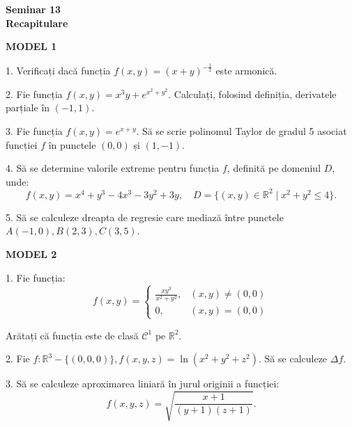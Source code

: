 \documentclass[11pt,a4paper]{article}
\newcommand\kal{\mathcal}
\newcommand\RR{\mathbb{R}}
\theoremstyle{dotless}
\theoremstyle{dotlessdr}
\begin{document}
\begin{center}
  {\large\textbf{Seminar 13 \\ Recapitulare}}
\end{center}

\textbf{MODEL 1}

1. Verificați dacă funcția $f(x, y) = (x + y)^{-\frac{1}{2}}$ este armonică.

\vspace{1cm}

2. Fie funcția $f(x, y) = x^3y + e^{x^2 + y^2}$. Calculați, folosind definiția,
derivatele parțiale în $(-1, 1)$.

\vspace{1cm}

3. Fie funcția $f(x, y) = e^{x + y}$. Să se scrie polinomul Taylor de gradul 5
asociat funcției $f$ în punctele $(0, 0)$ și $(1, -1)$.

\vspace{1cm}

4. Să se determine valorile extreme pentru funcția $f$, definită pe domeniul $D$,
unde:
\[
  f(x, y) = x^4 + y^3 - 4x^3 - 3y^2 + 3y, \quad
  D = \{(x, y) \in \RR^2 \mid x^2 + y^2 \leq 4 \}.
\]

\vspace{1cm}

5. Să se calculeze dreapta de regresie care mediază între punctele
$A(-1, 0), B(2, 3), C(3, 5)$.

\vspace{2cm}

\textbf{MODEL 2}

1. Fie funcția:
\[
  f(x, y) = \begin{cases}
    \frac{xy^3}{x^2 + y^2}, & (x, y) \neq (0, 0) \\
    0, & (x, y) = (0, 0)
  \end{cases}
\]

Arătați că funcția este de clasă $\kal{C}^1$ pe $\RR^2$.

\vspace{1cm}

2. Fie $f : \RR^3 - \{(0, 0, 0) \}, f(x,y,z) = \ln(x^2 + y^2 + z^2)$. Să se
calculeze $\Delta f$.

\vspace{1cm}

3. Să se calculeze aproximarea liniară în jurul originii a funcției:
\[
  f(x, y, z) = \sqrt{\frac{x + 1}{(y + 1)(z + 1)}}.
\]

\vspace{1cm}
\end{document}
